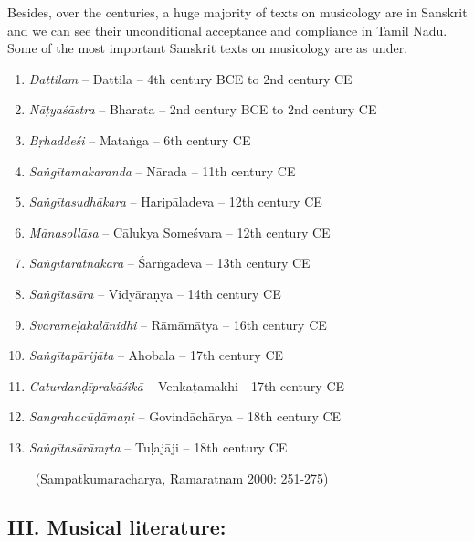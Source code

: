 Besides, over the centuries, a huge majority of texts on musicology are in Sanskrit and we can see their unconditional acceptance and compliance in Tamil Nadu. Some of the most important Sanskrit texts on musicology are as under.

\begin{enumerate}[{\rm 1.}]
\itemsep=0pt
\item \textit{Dattilam} – Dattila – 4th century BCE to 2nd century CE

 \item \textit{Nāṭyaśāstra} – Bharata – 2nd century BCE to 2nd century CE

 \item \textit{Bṛhaddeśi} – Mataṅga – 6th century CE

 \item \textit{Saṅgītamakaranda} – Nārada – 11th century CE

 \item \textit{Saṅgītasudhākara} – Haripāladeva – 12th century CE

 \item \textit{Mānasollāsa} – Cālukya Someśvara – 12th century CE

 \item \textit{Saṅgītaratnākara} – Śarṅgadeva – 13th century CE

 \item \textit{Saṅgītasāra }– Vidyāraṇya – 14th century CE

 \item \textit{Svarameḷakalānidhi} – Rāmāmātya – 16th century CE

 \item \textit{Saṅgītapārijāta} – Ahobala – 17th century CE

 \item \textit{Caturdanḍīprakāśikā} – Venkaṭamakhi - 17th century CE

 \item \textit{Sangrahacūḍāmaṇi} – Govindāchārya – 18th century CE

 \item \textit{Saṅgītasārāmṛta} – Tuḷajāji – 18th century CE

~\hfill (Sampatkumaracharya, Ramaratnam 2000: 251-275)

\end{enumerate}


\subsection*{III. Musical literature:}


